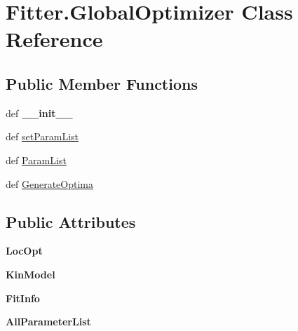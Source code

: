 \hypertarget{classFitter_1_1GlobalOptimizer}{\section{\-Fitter.\-Global\-Optimizer \-Class \-Reference}
\label{classFitter_1_1GlobalOptimizer}
}
\subsection*{\-Public \-Member \-Functions}
\begin{DoxyCompactItemize}
\item 
\hypertarget{classFitter_1_1GlobalOptimizer_a02b8c24b29b93dcc5f787e7dfa7e6cb7}{def {\bfseries \-\_\-\-\_\-init\-\_\-\-\_\-}}\label{classFitter_1_1GlobalOptimizer_a02b8c24b29b93dcc5f787e7dfa7e6cb7}

\item 
def \hyperlink{classFitter_1_1GlobalOptimizer_aa1ef78b64b9b251bd935376050c277eb}{set\-Param\-List}
\item 
def \hyperlink{classFitter_1_1GlobalOptimizer_a4410e98d47bb250ed5a9eabc53c4c015}{\-Param\-List}
\item 
def \hyperlink{classFitter_1_1GlobalOptimizer_adde2457cb87737417eac13ee32178ef1}{\-Generate\-Optima}
\end{DoxyCompactItemize}
\subsection*{\-Public \-Attributes}
\begin{DoxyCompactItemize}
\item 
\hypertarget{classFitter_1_1GlobalOptimizer_a2a4f246967c95a49db6bcad8bc55b164}{{\bfseries \-Loc\-Opt}}\label{classFitter_1_1GlobalOptimizer_a2a4f246967c95a49db6bcad8bc55b164}

\item 
\hypertarget{classFitter_1_1GlobalOptimizer_a628a20f058a11e59bf310108612f5132}{{\bfseries \-Kin\-Model}}\label{classFitter_1_1GlobalOptimizer_a628a20f058a11e59bf310108612f5132}

\item 
\hypertarget{classFitter_1_1GlobalOptimizer_a676eeb80d9a67446c9d06bad0f2882f2}{{\bfseries \-Fit\-Info}}\label{classFitter_1_1GlobalOptimizer_a676eeb80d9a67446c9d06bad0f2882f2}

\item 
\hypertarget{classFitter_1_1GlobalOptimizer_afb280c57f6d69aa1f72a89d9b05436e2}{{\bfseries \-All\-Parameter\-List}}\label{classFitter_1_1GlobalOptimizer_afb280c57f6d69aa1f72a89d9b05436e2}

\end{DoxyCompactItemize}


